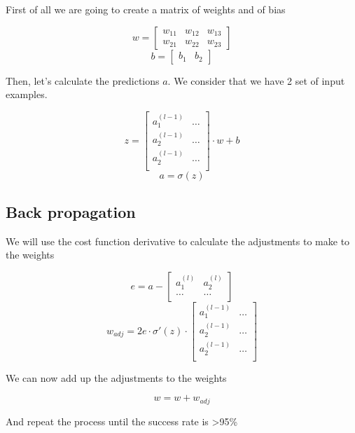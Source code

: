 \documentclass[]{report}
\begin{document}
{First of all we are going to create a matrix of weights and of bias}

\[w=\begin{bmatrix}
w_{11} & w_{12} & w_{13}\\
w_{21} & w_{22} & w_{23}
\end{bmatrix}\]
\[b=\begin{bmatrix}
b_{1} & b_{2}
\end{bmatrix}\]

{Then, let's calculate the predictions $a$. We consider that we have 2 set of input examples.}

\[z=\begin{bmatrix}
a^{(l-1)}_1 & \ldots \\
a^{(l-1)}_2 & \ldots \\
a^{(l-1)}_2 & \ldots \\
\end{bmatrix}\cdot w+b\]
\[a=\sigma (z)\]

\subsection{Back propagation}

{We will use the cost function derivative to calculate the adjustments to make to the weights}

\[e=a-\begin{bmatrix}
a^{(l)}_1 & a^{(l)}_2 \\
\ldots & \ldots \\
\end{bmatrix}\]
\[w_{adj}=2e \cdot \sigma\prime (z)\cdot
\begin{bmatrix}
a^{(l-1)}_1 & \ldots \\
a^{(l-1)}_2 & \ldots \\
a^{(l-1)}_2 & \ldots \\
\end{bmatrix}\]

{We can now add up the adjustments to the weights}

\[w=w+w_{adj}\]

{And repeat the process until the success rate is >95\%}
\end{document}
